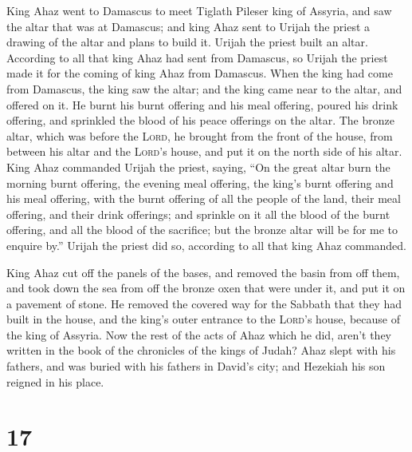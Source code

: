  King Ahaz went to Damascus to meet Tiglath Pileser king
of Assyria, and saw the altar that was at Damascus; and king Ahaz sent
to Urijah the priest a drawing of the altar and plans to build it.
 Urijah the priest built an altar. According to all that
king Ahaz had sent from Damascus, so Urijah the priest made it for the
coming of king Ahaz from Damascus.  When the king had
come from Damascus, the king saw the altar; and the king came near to
the altar, and offered on it.  He burnt his burnt
offering and his meal offering, poured his drink offering, and sprinkled
the blood of his peace offerings on the altar.  The
bronze altar, which was before the \textsc{Lord}, he brought from the
front of the house, from between his altar and the \textsc{Lord}'s
house, and put it on the north side of his altar.  King
Ahaz commanded Urijah the priest, saying, ``On the great altar burn the
morning burnt offering, the evening meal offering, the king's burnt
offering and his meal offering, with the burnt offering of all the
people of the land, their meal offering, and their drink offerings; and
sprinkle on it all the blood of the burnt offering, and all the blood of
the sacrifice; but the bronze altar will be for me to enquire by.''
 Urijah the priest did so, according to all that king
Ahaz commanded.

 King Ahaz cut off the panels of the bases, and removed
the basin from off them, and took down the sea from off the bronze oxen
that were under it, and put it on a pavement of stone. 
He removed the covered way for the Sabbath that they had built in the
house, and the king's outer entrance to the \textsc{Lord}'s house,
because of the king of Assyria.  Now the rest of the acts
of Ahaz which he did, aren't they written in the book of the chronicles
of the kings of Judah?  Ahaz slept with his fathers, and
was buried with his fathers in David's city; and Hezekiah his son
reigned in his place.

\hypertarget{section-16}{%
\section{17}\label{section-16}}

